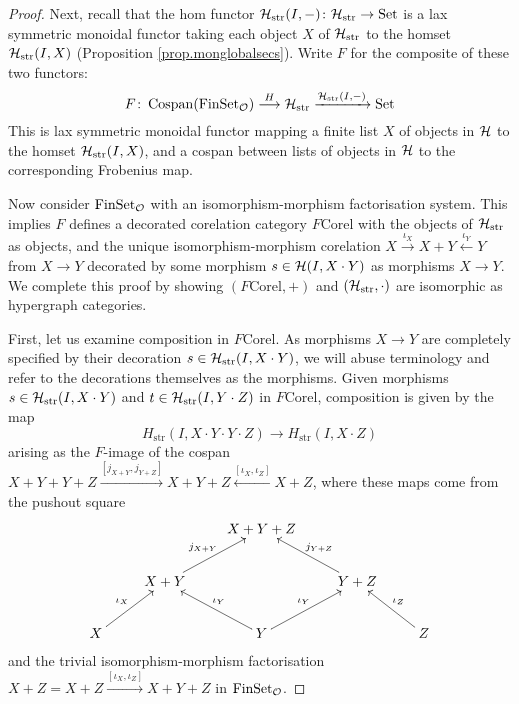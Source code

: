 \begin{proof}
  Next, recall that the hom functor $\mathcal H_{\mathrm{str}}(I,-){\colon} \mathcal
  H_{\mathrm{str}} \to \mathrm{Set}$ is a lax symmetric monoidal functor taking each
  object $X$ of $\mathcal H_{\mathrm{str}}$ to the homset $\mathcal H_{\mathrm{str}}(I,X)$
  (Proposition \ref{prop.monglobalsecs}). Write $F$ for the composite of these
  two functors: 
  \[
    F{\colon} \operatorname{{Cospan}}(\mathrm{FinSet}_{\mathcal O}) \stackrel{H}\longrightarrow \mathcal
    H_{\mathrm{str}} \xrightarrow{\mathcal H_{\mathrm{str}}(I,-)} \mathrm{Set}
  \]
  This is lax symmetric monoidal functor mapping a finite list $X$ of objects in
  $\mathcal H$ to the homset $\mathcal H_{\mathrm{str}}(I,X)$, and a cospan between lists
  of objects in $\mathcal H$ to the corresponding Frobenius map.

  Now consider $\mathrm{FinSet}_{\mathcal O}$ with an isomorphism-morphism factorisation
  system. This implies $F$ defines a decorated corelation category
  $F\mathrm{Corel}$ with the objects of $\mathcal H_{\mathrm{str}}$ as objects, and
  the unique isomorphism-morphism corelation $X \xrightarrow{\iota_X} X+Y
  \xleftarrow{\iota_Y} Y$ from $X \to Y$ decorated by some morphism $s \in \mathcal
  H(I,X\cdot Y)$ as morphisms $X \to Y$. We complete this proof by showing
  $(F\mathrm{Corel},+)$ and $(\mathcal H_{\mathrm{str}},\cdot)$ are isomorphic as
  hypergraph categories.
  
  First, let us examine composition in $F\mathrm{Corel}$. As morphisms $X \to Y$
  are completely specified by their decoration $s \in \mathcal
  H_{\mathrm{str}}(I,X\cdot Y)$, we will abuse terminology and refer to the
  decorations themselves as the morphisms.  Given morphisms $s \in \mathcal
  H_{\mathrm{str}}(I,X\cdot Y)$ and $t \in \mathcal H_{\mathrm{str}}(I,Y\cdot Z)$ in
  $F\mathrm{Corel}$, composition is given by the map 
  \[
    H_{\mathrm{str}}(I,X\cdot Y\cdot Y\cdot Z) \to H_{\mathrm{str}}(I,X\cdot Z)
  \]
  arising as the $F$-image of the cospan $X+Y+Y+Z
  \xrightarrow{[j_{X+Y},j_{Y+Z}]} X+Y+Z \xleftarrow{[\iota_X,\iota_Z]} X+Z$,
  where these maps come from the pushout square
  \[
    \xymatrix{
      && X+Y+Z \\
      & X+Y \ar[ur]^{j_{X+Y}} && Y+Z \ar[ul]_{j_{Y+Z}} \\
      X \ar[ur]^{\iota_X} && Y \ar[ul]_{\iota_Y} \ar[ur]^{\iota_Y} && Z
      \ar[ul]_{\iota_Z}
    }
  \]
  and the trivial isomorphism-morphism factorisation $X+Z = X+Z
  \xrightarrow{[\iota_X,\iota_Z]} X+Y+Z$ in $\mathrm{FinSet}_{\mathcal O}$.
  

\end{proof}
